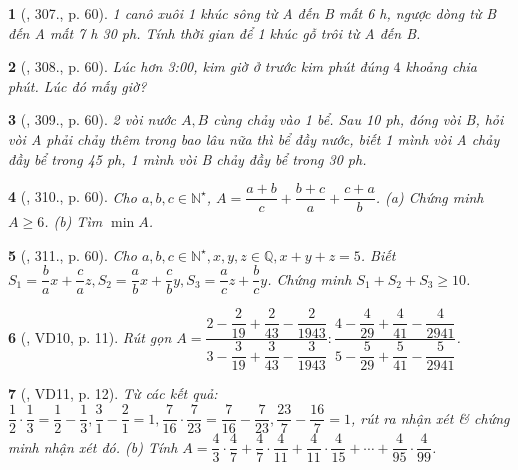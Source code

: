 \documentclass{article}
\newtheorem{baitoan}{}
\begin{document}
\begin{baitoan}[\cite{Tuyen_Toan_6}, 307., p. 60]
	1 canô xuôi 1 khúc sông từ A đến B mất {\rm6 h}, ngược dòng từ B đến A mất {\rm7 h 30 ph}. Tính thời gian để 1 khúc gỗ trôi từ A đến B.
\end{baitoan}

\begin{baitoan}[\cite{Tuyen_Toan_6}, 308., p. 60]
	Lúc hơn {\rm3:00}, kim giờ ở trước kim phút đúng $4$ khoảng chia phút. Lúc đó mấy giờ?
\end{baitoan}

\begin{baitoan}[\cite{Tuyen_Toan_6}, 309., p. 60]
	2 vòi nước $A,B$ cùng chảy vào 1 bể. Sau {\rm10 ph}, đóng vòi B, hỏi vòi A phải chảy thêm trong bao lâu nữa thì bể đầy nước, biết 1 mình vòi A chảy đầy bể trong {\rm45 ph}, 1 mình vòi B chảy đầy bể trong {\rm30 ph}.
\end{baitoan}

\begin{baitoan}[\cite{Tuyen_Toan_6}, 310., p. 60]
	Cho $a,b,c\in\mathbb{N}^\star$, $A = \dfrac{a + b}{c} + \dfrac{b + c}{a} + \dfrac{c + a}{b}$. (a) Chứng minh $A\ge6$. (b) Tìm $\min A$.
\end{baitoan}

\begin{baitoan}[\cite{Tuyen_Toan_6}, 311., p. 60]
	Cho $a,b,c\in\mathbb{N}^\star,x,y,z\in\mathbb{Q},x + y + z = 5$. Biết $S_1 = \dfrac{b}{a}x + \dfrac{c}{a}z,S_2 = \dfrac{a}{b}x + \dfrac{c}{b}y,S_3 = \dfrac{a}{c}z + \dfrac{b}{c}y$. Chứng minh $S_1 + S_2 + S_3\ge10$.
\end{baitoan}

\begin{baitoan}[\cite{Binh_Toan_6_tap_2}, VD10, p. 11]
	Rút gọn $A = \dfrac{2 - \dfrac{2}{19} + \dfrac{2}{43} - \dfrac{2}{1943}}{3 - \dfrac{3}{19} + \dfrac{3}{43} - \dfrac{3}{1943}}:\dfrac{4 - \dfrac{4}{29} + \dfrac{4}{41} - \dfrac{4}{2941}}{5 - \dfrac{5}{29} + \dfrac{5}{41} - \dfrac{5}{2941}}$.
\end{baitoan}

\begin{baitoan}[\cite{Binh_Toan_6_tap_2}, VD11, p. 12]
	Từ các kết quả: $\dfrac{1}{2}\cdot\dfrac{1}{3} = \dfrac{1}{2} - \dfrac{1}{3},\dfrac{3}{1} - \dfrac{2}{1} = 1,\dfrac{7}{16}\cdot\dfrac{7}{23} = \dfrac{7}{16} - \dfrac{7}{23},\dfrac{23}{7} - \dfrac{16}{7} = 1$, rút ra nhận xét \& chứng minh nhận xét đó. (b) Tính $A = \dfrac{4}{3}\cdot\dfrac{4}{7} + \dfrac{4}{7}\cdot\dfrac{4}{11} +  \dfrac{4}{11}\cdot\dfrac{4}{15} + \cdots + \dfrac{4}{95}\cdot\dfrac{4}{99}$.
\end{baitoan}
\end{document}
